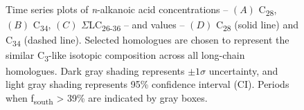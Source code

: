 \begin{figure}[p]
	\caption[\textit{n}-alkanoic acid concentration and  time-series plots]{Time series plots of \textit{n}-alkanoic acid concentrations -- $(A)$ C\textsubscript{28}, $(B)$ C\textsubscript{34}, $(C)$ $\Sigma$LC\textsubscript{26-36} -- and  values -- $(D)$ C\textsubscript{28} (solid line) and C\textsubscript{34} (dashed line). Selected homologues are chosen to represent the similar C\textsubscript{3}-like isotopic composition across all long-chain homologues. Dark gray shading represents $\pm 1\sigma$ uncertainty, and light gray shading represents 95\% confidence interval (CI). Periods when f\textsubscript{south} > 39\% are indicated by gray boxes.}
	\label{Ch4Fig:7}
\end{figure}

